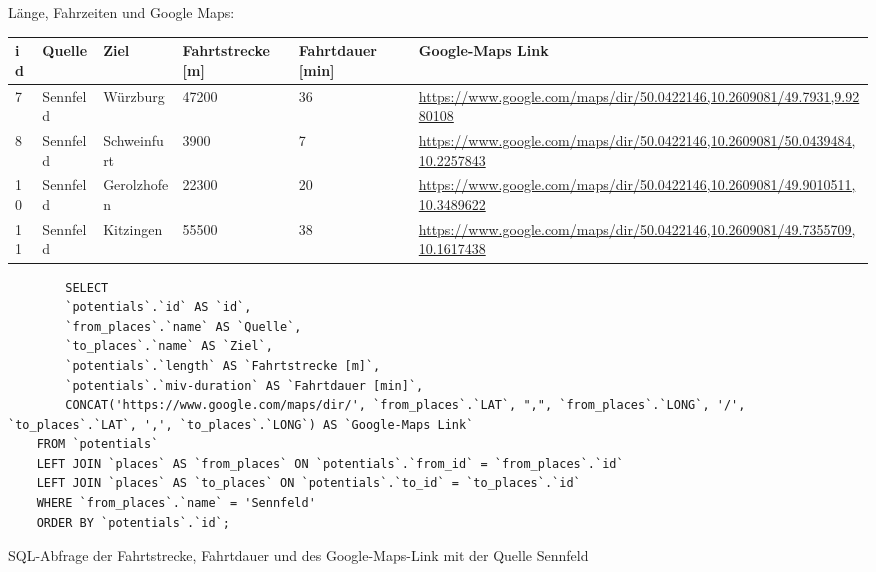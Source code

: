 Länge, Fahrzeiten und Google Maps:
\newline
\begin{tabular}{| l | l | l | l | l | l |}
    \hline
    id & Quelle & Ziel & Fahrtstrecke [m] & Fahrtdauer [min] & Google-Maps Link\\ 
    \hline
    7 & Sennfeld & Würzburg & 47200 & 36 & \href{https://www.google.com/maps/dir/50.0422146,10.2609081/49.7931,9.9280108}{https://www.google.com/maps/dir/50.0422146,10.2609081/49.7931,9.9280108}\\ 
    \hline
    8 & Sennfeld & Schweinfurt & 3900 & 7 & \href{https://www.google.com/maps/dir/50.0422146,10.2609081/50.0439484,10.2257843}{https://www.google.com/maps/dir/50.0422146,10.2609081/50.0439484,10.2257843}\\ 
    \hline
    10 & Sennfeld & Gerolzhofen & 22300 & 20 & \href{https://www.google.com/maps/dir/50.0422146,10.2609081/49.9010511,10.3489622}{https://www.google.com/maps/dir/50.0422146,10.2609081/49.9010511,10.3489622}\\ 
    \hline
    11 & Sennfeld & Kitzingen & 55500 & 38 & \href{https://www.google.com/maps/dir/50.0422146,10.2609081/49.7355709,10.1617438}{https://www.google.com/maps/dir/50.0422146,10.2609081/49.7355709,10.1617438}\\
    \hline
\end{tabular}    
\newline
\newline
\begin{listing}[htbp]
    \begin{verbatim}
        SELECT 
        `potentials`.`id` AS `id`, 
        `from_places`.`name` AS `Quelle`,
        `to_places`.`name` AS `Ziel`, 
        `potentials`.`length` AS `Fahrtstrecke [m]`, 
        `potentials`.`miv-duration` AS `Fahrtdauer [min]`,
        CONCAT('https://www.google.com/maps/dir/', `from_places`.`LAT`, ",", `from_places`.`LONG`, '/', `to_places`.`LAT`, ',', `to_places`.`LONG`) AS `Google-Maps Link`
    FROM `potentials`
    LEFT JOIN `places` AS `from_places` ON `potentials`.`from_id` = `from_places`.`id`
    LEFT JOIN `places` AS `to_places` ON `potentials`.`to_id` = `to_places`.`id`
    WHERE `from_places`.`name` = 'Sennfeld'
    ORDER BY `potentials`.`id`;
    \end{verbatim}
    \caption{SQL-Abfrage der Fahrtstrecke, Fahrtdauer und des Google-Maps-Link mit der Quelle Sennfeld}\label{lst-f-sennfeld}
\end{listing}